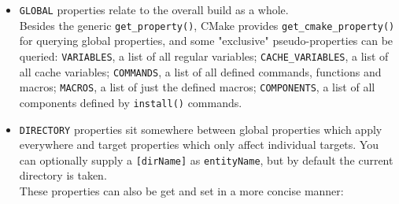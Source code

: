 \documentclass[table, xcdraw]{article}%
\begin{document}
\begin{itemize}
    \item \texttt{GLOBAL} properties relate to the overall build as a whole.\\
    Besides the generic \texttt{get_property()}, CMake provides \texttt{get_cmake_property()} for querying global properties, and some "exclusive" pseudo-properties can be queried: \texttt{VARIABLES}, a list of all regular variables; \texttt{CACHE_VARIABLES}, a list of all cache variables; \texttt{COMMANDS}, a list of all defined commands, functions and macros; \texttt{MACROS}, a list of just the defined macros; \texttt{COMPONENTS}, a list of all components defined by \texttt{install()} commands.
    \item \texttt{DIRECTORY} properties sit somewhere between global properties which apply everywhere and target properties which only affect individual targets. You can optionally supply a \texttt{[dirName]} as \texttt{entityName}, but by default the current directory is taken.\\
    These properties can also be get and set in a more concise manner:
    

\end{itemize}
\end{document}
